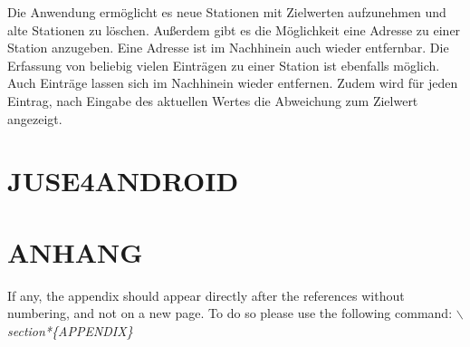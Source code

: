 \documentclass[a4paper,twoside]{article}
\begin{document}
Die Anwendung ermöglicht es neue Stationen mit Zielwerten aufzunehmen und alte Stationen zu löschen. Außerdem gibt es die Möglichkeit eine Adresse zu einer Station anzugeben. Eine Adresse ist im Nachhinein auch wieder entfernbar. Die Erfassung von beliebig vielen Einträgen zu einer Station ist ebenfalls möglich. Auch Einträge lassen sich im Nachhinein wieder entfernen. Zudem wird für jeden Eintrag, nach Eingabe des aktuellen Wertes die Abweichung zum Zielwert angezeigt.

\section{\uppercase{JUSE4Android}}

\vfill

{\small
}

\section*{\uppercase{Anhang}}

\noindent If any, the appendix should appear directly after the
references without numbering, and not on a new page. To do so please use the following command:
\textit{$\backslash$section*\{APPENDIX\}}


\vfill
\end{document}
